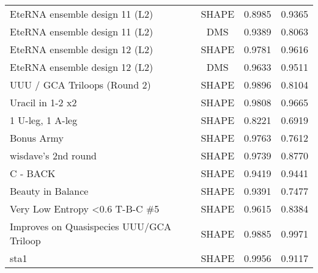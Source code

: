 \documentclass[letter]{bioinfo}
\begin{document}
\begin{center}
\begin{longtable}{lccc}
EteRNA ensemble design 11 (L2)	&	SHAPE	&	0.8985 	&	0.9365 	\\
EteRNA ensemble design 11 (L2)	&	DMS	&	0.9389 	&	0.8063 	\\
EteRNA ensemble design 12 (L2)	&	SHAPE	&	0.9781 	&	0.9616 	\\
EteRNA ensemble design 12 (L2)	&	DMS	&	0.9633 	&	0.9511 	\\
UUU / GCA Triloops (Round 2)	&	SHAPE	&	0.9896 	&	0.8104 	\\
Uracil in 1-2 x2	&	SHAPE	&	0.9808 	&	0.9665 	\\
1 U-leg, 1 A-leg	&	SHAPE	&	0.8221 	&	0.6919 	\\
Bonus Army	&	SHAPE	&	0.9763 	&	0.7612 	\\
wisdave's 2nd round	&	SHAPE	&	0.9739 	&	0.8770 	\\
C - BACK	&	SHAPE	&	0.9419 	&	0.9441 	\\
Beauty in Balance	&	SHAPE	&	0.9391 	&	0.7477 	\\
Very Low Entropy <0.6 T-B-C \#5	&	SHAPE	&	0.9615 	&	0.8384 	\\
Improves on Quasispecies UUU/GCA Triloop	&	SHAPE	&	0.9885 	&	0.9971 	\\
sta1	&	SHAPE	&	0.9956 	&	0.9117 	\\




\end{longtable}
\end{center}







\twocolumn










%
%

\end{document}
